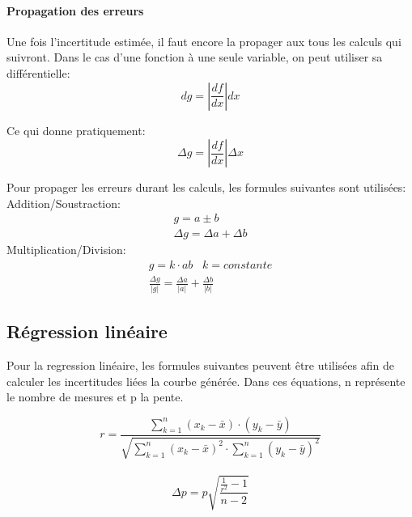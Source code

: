 \paragraph{Propagation des erreurs}
Une fois l'incertitude estimée, il faut encore la propager aux tous les calculs qui suivront. Dans le cas d'une fonction à une seule variable, on peut utiliser sa différentielle:
\begin{equation}
    dg=|{\frac{df}{dx}}|dx
\end{equation}

Ce qui donne pratiquement:
\begin{equation}
    \Delta g=|\frac{df}{dx}|\Delta x
\end{equation}

Pour propager les erreurs durant les calculs, les formules suivantes sont utilisées:\\
Addition/Soustraction:
\begin{equation}
    \begin{split}
	g = a \pm b\\
	\Delta g = \Delta a + \Delta b
    \end{split}
\end{equation}
Multiplication/Division:
\begin{equation}
    \label{multdiv}
    \begin{split}
	g = k\cdot ab \;\;\; k=constante\\
	\frac{\Delta g}{|g|} = \frac{\Delta a}{|a|} + \frac{\Delta b}{|b|}
    \end{split}
\end{equation}

\subsection{Régression linéaire}

Pour la regression linéaire, les formules suivantes peuvent être utilisées afin de calculer les incertitudes liées la courbe générée.
Dans ces équations, n représente le nombre de mesures et p la pente.

\begin{equation}
    \label{regressionr}
    r=\frac{\sum_{k=1}^{n}(x_k-\bar{x})\cdot(y_k-\bar{y})}{\sqrt{\sum_{k=1}^{n}(x_k-\bar{x})^2\cdot\sum_{k=1}^{n}(y_k-\bar{y})^2}}
\end{equation}
\\

\begin{equation}
    \label{deltam}
    \Delta p=p\sqrt{\frac{\frac{1}{r^2}-1}{n-2}}
\end{equation}
